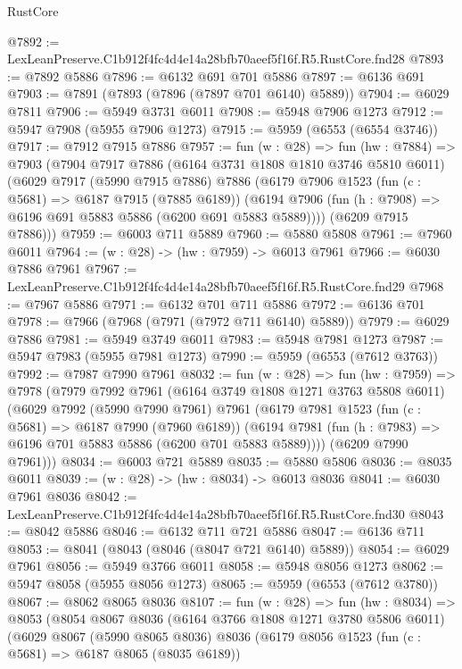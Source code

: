 \begin{lexlean}{RustCore}
\begin{coremodule}
@7892 := LexLeanPreserve.C1b912f4fc4d4e14a28bfb70aeef5f16f.R5.RustCore.fnd28
@7893 := @7892 @5886
@7896 := @6132 @691 @701 @5886
@7897 := @6136 @691
@7903 := @7891 (@7893 (@7896 (@7897 @701 @6140) @5889))
@7904 := @6029 @7811
@7906 := @5949 @3731 @6011
@7908 := @5948 @7906 @1273
@7912 := @5947 @7908 (@5955 @7906 @1273)
@7915 := @5959 (@6553 (@6554 @3746))
@7917 := @7912 @7915 @7886
@7957 := fun (w : @28) =>
  fun (hw : @7884) =>
  @7903
    (@7904
      @7917
      @7886
      (@6164 @3731 @1808 @1810 @3746 @5810 @6011)
      (@6029
        @7917
        (@5990 @7915 @7886)
        @7886
        (@6179
          @7906
          @1523
          (fun (c : @5681) => @6187 @7915 (@7885 @6189))
          (@6194 @7906 (fun (h : @7908) => @6196 @691 @5883 @5886 (@6200 @691 @5883 @5889))))
        (@6209 @7915 @7886)))
@7959 := @6003 @711 @5889
@7960 := @5880 @5808
@7961 := @7960 @6011
@7964 := (w : @28) -> (hw : @7959) -> @6013 @7961
@7966 := @6030 @7886 @7961
@7967 := LexLeanPreserve.C1b912f4fc4d4e14a28bfb70aeef5f16f.R5.RustCore.fnd29
@7968 := @7967 @5886
@7971 := @6132 @701 @711 @5886
@7972 := @6136 @701
@7978 := @7966 (@7968 (@7971 (@7972 @711 @6140) @5889))
@7979 := @6029 @7886
@7981 := @5949 @3749 @6011
@7983 := @5948 @7981 @1273
@7987 := @5947 @7983 (@5955 @7981 @1273)
@7990 := @5959 (@6553 (@7612 @3763))
@7992 := @7987 @7990 @7961
@8032 := fun (w : @28) =>
  fun (hw : @7959) =>
  @7978
    (@7979
      @7992
      @7961
      (@6164 @3749 @1808 @1271 @3763 @5808 @6011)
      (@6029
        @7992
        (@5990 @7990 @7961)
        @7961
        (@6179
          @7981
          @1523
          (fun (c : @5681) => @6187 @7990 (@7960 @6189))
          (@6194 @7981 (fun (h : @7983) => @6196 @701 @5883 @5886 (@6200 @701 @5883 @5889))))
        (@6209 @7990 @7961)))
@8034 := @6003 @721 @5889
@8035 := @5880 @5806
@8036 := @8035 @6011
@8039 := (w : @28) -> (hw : @8034) -> @6013 @8036
@8041 := @6030 @7961 @8036
@8042 := LexLeanPreserve.C1b912f4fc4d4e14a28bfb70aeef5f16f.R5.RustCore.fnd30
@8043 := @8042 @5886
@8046 := @6132 @711 @721 @5886
@8047 := @6136 @711
@8053 := @8041 (@8043 (@8046 (@8047 @721 @6140) @5889))
@8054 := @6029 @7961
@8056 := @5949 @3766 @6011
@8058 := @5948 @8056 @1273
@8062 := @5947 @8058 (@5955 @8056 @1273)
@8065 := @5959 (@6553 (@7612 @3780))
@8067 := @8062 @8065 @8036
@8107 := fun (w : @28) =>
  fun (hw : @8034) =>
  @8053
    (@8054
      @8067
      @8036
      (@6164 @3766 @1808 @1271 @3780 @5806 @6011)
      (@6029
        @8067
        (@5990 @8065 @8036)
        @8036
        (@6179
          @8056
          @1523
          (fun (c : @5681) => @6187 @8065 (@8035 @6189))

\end{coremodule}
\end{lexlean}
